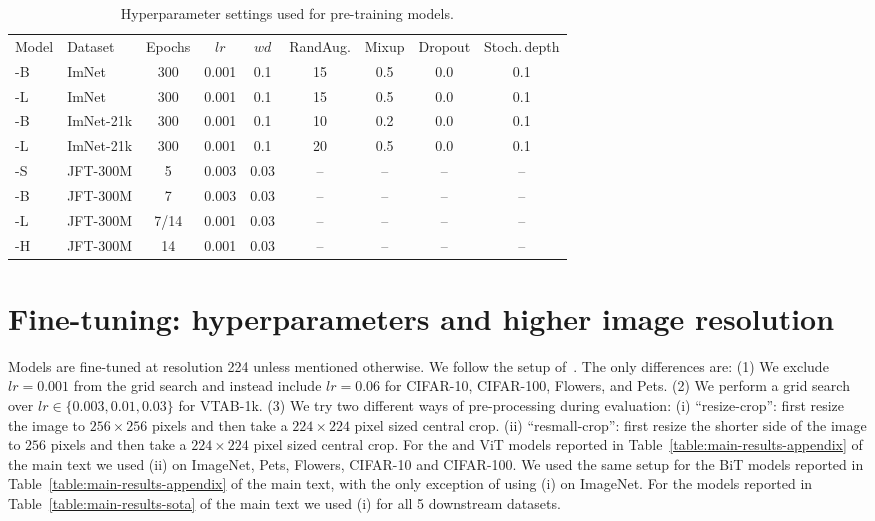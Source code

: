 \begin{table}
  \caption{Hyperparameter settings used for pre-training \name{} models.}
  \medskip
  \label{appendix:table:reg}
  \centering
  \small
  \begin{tabular}{@{}llccccccc@{}}
    \toprule
    Model & Dataset & Epochs & $lr$ & $wd$ & \hspace{-1ex}RandAug. & Mixup & Dropout & \hspace{-1ex}Stoch.\,depth  \\
    \cmidrule{1-9}
    \name{}-B & ImNet & 300 & 0.001 & 0.1 &  15 & 0.5 & 0.0 & 0.1 \\
    \name{}-L & ImNet & 300 & 0.001 & 0.1 &  15 & 0.5 & 0.0 & 0.1 \\
    \name{}-B & ImNet-21k\hspace{-1ex} & 300 & 0.001 & 0.1 & 10 & 0.2 & 0.0 & 0.1 \\
    \name{}-L & ImNet-21k\hspace{-1ex} & 300 & 0.001 & 0.1 & 20 & 0.5 & 0.0 & 0.1 \\
    \name{}-S& JFT-300M & 5 & 0.003 & 0.03 &  -- & -- & -- & -- \\
    \name{}-B& JFT-300M & 7 & 0.003 & 0.03 &  -- & -- & -- & -- \\
    \name{}-L& JFT-300M & 7/14 & 0.001 & 0.03 &  -- & -- & -- & -- \\
    \name{}-H& JFT-300M & 14 & 0.001 & 0.03 &  -- & -- & -- & -- \\
    \bottomrule
  \end{tabular}
\end{table}

\section{Fine-tuning: hyperparameters and higher image resolution}
\label{appendix:sec:fine-tuning}
Models are fine-tuned at resolution 224 unless mentioned otherwise.
We follow the setup of~\cite{Dosovitskiy2021}.
The only differences are:
(1) We exclude $lr=0.001$ from the grid search and instead include $lr=0.06$ for CIFAR-10, CIFAR-100, Flowers, and Pets.
(2) We perform a grid search over $lr\in\{0.003,0.01, 0.03\}$ for VTAB-1k.
(3) We try two different ways of pre-processing during evaluation:
(i) ``resize-crop'': first resize the image to $256\times256$ pixels and then take a $224\times224$ pixel sized central crop.
(ii) ``resmall-crop'': first resize the shorter side of the image to $256$ pixels and then take a $224\times224$ pixel sized central crop.
For the \name{} and ViT models reported in Table~\ref{table:main-results-appendix} of the main text we used (ii) on ImageNet, Pets, Flowers, CIFAR-10 and CIFAR-100.
We used the same setup for the BiT models reported in Table~\ref{table:main-results-appendix} of the main text, with the only exception of using (i) on ImageNet.
For the \name{} models reported in Table~\ref{table:main-results-sota} of the main text we used (i) for all 5 downstream datasets.


